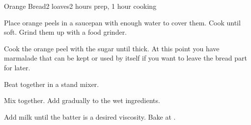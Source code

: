 \documentclass[../Cookbook.tex]{subfiles}
\begin{document}
\begin{recipe}{Orange Bread}{2 loaves}{2 hours prep, 1 hour cooking}

Place orange peels in a saucepan with enough water to cover them. Cook until soft. Grind them up with a food grinder.

Cook the orange peel with the sugar until thick. At this point you have marmalade that can be kept or used by itself if you want to leave the bread part for later.

Beat together in a stand mixer.

Mix together. Add gradually to the wet ingredients.

Add milk until the batter is a desired viscosity.
Bake at  .

\end{recipe}
\end{document}
